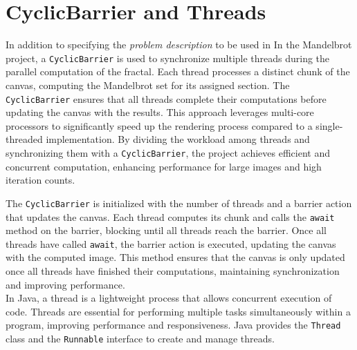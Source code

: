 \documentclass[sigconf]{acmart}
\begin{document}
\section{CyclicBarrier and Threads}

In addition to specifying the {\itshape problem description} to be used in
In the Mandelbrot project, a \texttt{CyclicBarrier} is used to synchronize multiple threads during the parallel computation of the fractal. Each thread processes a distinct chunk of the canvas, computing the Mandelbrot set for its assigned section. The \texttt{CyclicBarrier} ensures that all threads complete their computations before updating the canvas with the results. This approach leverages multi-core processors to significantly speed up the rendering process compared to a single-threaded implementation. By dividing the workload among threads and synchronizing them with a \texttt{CyclicBarrier}, the project achieves efficient and concurrent computation, enhancing performance for large images and high iteration counts.

The \texttt{CyclicBarrier} is initialized with the number of threads and a barrier action that updates the canvas. Each thread computes its chunk and calls the \texttt{await} method on the barrier, blocking until all threads reach the barrier. Once all threads have called \texttt{await}, the barrier action is executed, updating the canvas with the computed image. This method ensures that the canvas is only updated once all threads have finished their computations, maintaining synchronization and improving performance.
\\
In Java, a thread is a lightweight process that allows concurrent execution of code. Threads are essential for performing multiple tasks simultaneously within a program, improving performance and responsiveness. Java provides the \texttt{Thread} class and the \texttt{Runnable} interface to create and manage threads.
\end{document}
